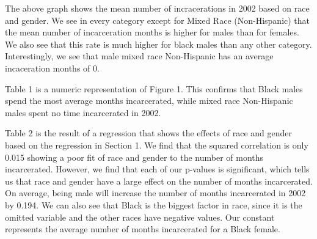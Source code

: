 \documentclass{article}
\begin{document}
The above graph shows the mean number of incracerations in 2002 based on race and gender. We see in every category except for Mixed Race (Non-Hispanic) that the mean number of incarceration months is higher for males than for females. We also see that this rate is much higher for black males than any other category. Interestingly, we see that male mixed race Non-Hispanic has an average incaceration months of 0. 



Table 1 is a numeric representation of Figure 1. This confirms that Black males spend the most average months incarcerated, while mixed race Non-Hispanic males spent no time incarcerated in 2002.



Table 2 is the result of a regression that shows the effects of race and gender based on the regression in Section 1. We find that the squared correlation is only 0.015 showing a poor fit of race and gender to the number of months incarcerated. However, we find that each of our p-values is significant, which tells us that race and gender have a large effect on the number of months incarcerated. On average, being male will increase the number of months incarcerated in 2002 by 0.194. We can also see that Black is the biggest factor in race, since it is the omitted variable and the other races have negative values. Our constant represents the average number of months incarcerated for a Black female. 
\end{document}
